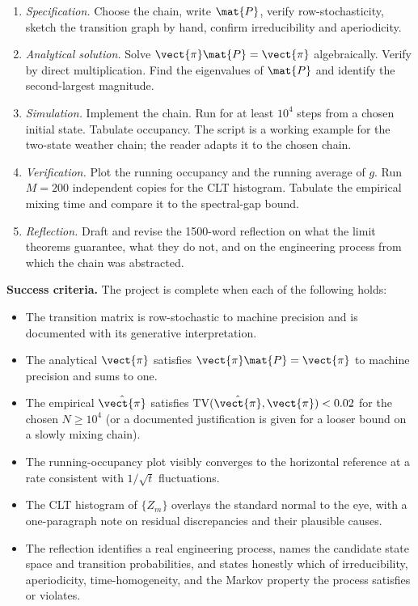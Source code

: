 \begin{project}
\begin{enumerate}[leftmargin=*]
  \item \emph{Specification.} Choose the chain, write $\mat{P}$,
    verify row-stochasticity, sketch the transition graph by hand,
    confirm irreducibility and aperiodicity.
  \item \emph{Analytical solution.} Solve $\vect{\pi}\mat{P} =
    \vect{\pi}$ algebraically. Verify by direct multiplication. Find
    the eigenvalues of $\mat{P}$ and identify the second-largest
    magnitude.
  \item \emph{Simulation.} Implement the chain. Run for at least
    $10^{4}$ steps from a chosen initial state. Tabulate occupancy.
    The script
    is a working example for the two-state weather chain; the reader
    adapts it to the chosen chain.
  \item \emph{Verification.} Plot the running occupancy and the
    running average of $g$. Run $M = 200$ independent copies for the
    CLT histogram. Tabulate the empirical mixing time and compare it
    to the spectral-gap bound.
  \item \emph{Reflection.} Draft and revise the 1500-word reflection
    on what the limit theorems guarantee, what they do not, and on
    the engineering process from which the chain was abstracted.
\end{enumerate}

\textbf{Success criteria.} The project is complete when each of the
following holds:

\begin{itemize}[leftmargin=*]
  \item The transition matrix is row-stochastic to machine precision
    and is documented with its generative interpretation.
  \item The analytical $\vect{\pi}$ satisfies $\vect{\pi}\mat{P} =
    \vect{\pi}$ to machine precision and sums to one.
  \item The empirical $\hat{\vect{\pi}}$ satisfies
    $\mathrm{TV}(\hat{\vect{\pi}}, \vect{\pi}) < 0.02$ for the chosen
    $N \geq 10^{4}$ (or a documented justification is given for a
    looser bound on a slowly mixing chain).
  \item The running-occupancy plot visibly converges to the
    horizontal reference at a rate consistent with $1/\sqrt{t}$
    fluctuations.
  \item The CLT histogram of $\{Z_{m}\}$ overlays the standard
    normal to the eye, with a one-paragraph note on residual
    discrepancies and their plausible causes.
  \item The reflection identifies a real engineering process, names
    the candidate state space and transition probabilities, and
    states honestly which of irreducibility, aperiodicity,
    time-homogeneity, and the Markov property the process satisfies
    or violates.
\end{itemize}


\end{project}
